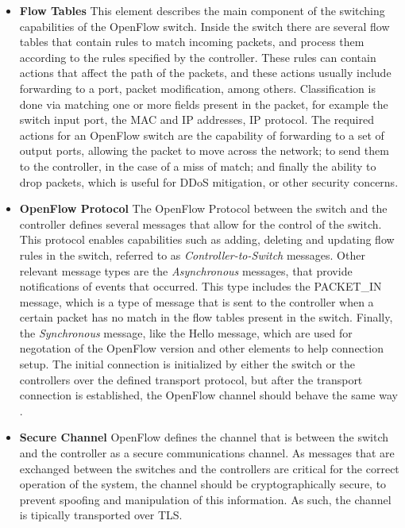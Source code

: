 \begin {enumerate}
\begin {itemize}
    \item \textbf {Flow Tables} This element describes the main component of the switching capabilities of the OpenFlow switch. Inside the switch there are several
        flow tables that contain rules to match incoming packets, and process them according to the rules specified by the controller. These rules can
        contain actions that affect the path of the packets, and these actions usually include forwarding to a port, packet modification, among others.
        Classification is done via matching one or more fields present in the packet, for example the switch input port, the MAC and IP addresses, IP protocol.
        The required actions for an OpenFlow switch are the capability of forwarding to a set of output ports, allowing the packet to move across the network;
        to send them to the controller, in the case of a miss of match; and finally the ability to drop packets, which is useful for DDoS mitigation, or other
        security concerns.
    \item \textbf {OpenFlow Protocol} The OpenFlow Protocol between the switch and the controller defines several messages that allow for the control of the switch.
        This protocol enables capabilities such as adding, deleting and updating flow rules in the switch, referred to as \textit {Controller-to-Switch}
        messages. Other relevant message types are the \textit {Asynchronous} messages, that provide notifications of events that occurred. This type includes
        the PACKET\_IN message, which is a type of message that is sent to the controller when a certain packet has no match in
        the flow tables present in the switch. Finally, the \textit{Synchronous} message, like the Hello message, which are used for negotation of the OpenFlow
        version and other elements to help connection setup. The initial connection is initialized by either the switch or the controllers over the defined
        transport protocol, but after the transport connection is established, the OpenFlow channel should behave the same way 
        \cite{open_networking_foundation_openflow_2015}.
    \item \textbf {Secure Channel} OpenFlow defines the channel that is between the switch and the controller as a secure communications channel. As messages 
        that are exchanged between the switches and the controllers are critical for the correct operation of the system, the channel should be cryptographically
        secure, to prevent spoofing and manipulation of this information. As such, the channel is tipically transported over TLS.
\end {itemize}


\end{enumerate}
